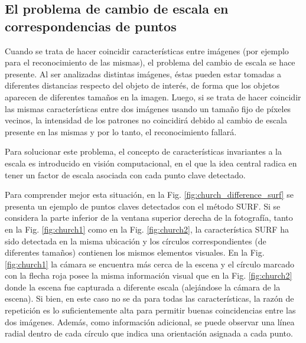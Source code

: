   \subsection[El problema de cambio de escala]{El problema de cambio de escala en correspondencias de puntos}
    \label{sec:problema_cambio_escala}
    Cuando se trata de hacer coincidir características entre imágenes (por ejemplo para el reconocimiento de las mismas), el problema del cambio de escala se hace presente. Al ser analizadas distintas imágenes, éstas pueden estar tomadas a diferentes distancias respecto del objeto de interés, de forma que los objetos aparecen de diferentes tamaños en la imagen. Luego, si se trata de hacer coincidir las mismas características entre dos imágenes usando un tamaño fijo de píxeles vecinos, la intensidad de los patrones no coincidirá debido al cambio de escala presente en las mismas y por lo tanto, el reconocimiento fallará.

    Para solucionar este problema, el concepto de características invariantes a la escala es introducido en visión computacional, en el que la idea central radica en tener un factor de escala asociada con cada punto clave detectado.
    
    Para comprender mejor esta situación, en la Fig. \ref{fig:church_difference_surf} se presenta un ejemplo de puntos claves detectados con el método SURF. Si se considera la parte inferior de la ventana superior derecha de la fotografía, tanto en la Fig. \ref{fig:church1} como en la Fig. \ref{fig:church2}, la característica SURF ha sido detectada en la misma ubicación y los círculos correspondientes (de diferentes tamaños) contienen los mismos elementos visuales. En la Fig. \ref{fig:church1} la cámara se encuentra más cerca de la escena y el círculo marcado con la flecha roja posee la misma información visual que en la Fig. \ref{fig:church2} donde la escena fue capturada a diferente escala (alejándose la cámara de la escena). %
    Si bien, en este caso no se da para todas las características, la razón de repetición es lo suficientemente alta para permitir buenas coincidencias entre las dos imágenes. Además, como información adicional, se puede observar una línea radial dentro de cada círculo que indica una orientación asignada a cada punto.%
